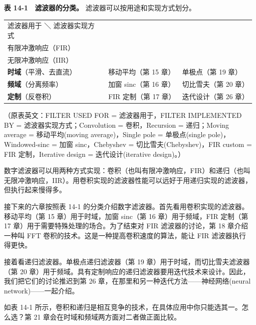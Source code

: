 \textbf{表 14-1　滤波器的分类。} 滤波器可以按用途和实现方式划分。

{\def\LTcaptype{none} %
\begin{longtable}[]{@{}
  >{\raggedright\arraybackslash}p{}
  >{\raggedright\arraybackslash}p{}
  >{\raggedright\arraybackslash}p{}@{}}
\toprule\noalign{}
\begin{minipage}[b]{\linewidth}\raggedright
滤波器用于 ＼ 滤波器实现方式
\end{minipage} & \begin{minipage}[b]{\linewidth}\raggedright
卷积\\
有限冲激响应（FIR）\strut
\end{minipage} & \begin{minipage}[b]{\linewidth}\raggedright
递归\\
无限冲激响应（IIR）\strut
\end{minipage} \\
\midrule\noalign{}
\endhead
\bottomrule\noalign{}
\endlastfoot
\textbf{时域}（平滑、去直流） & 移动平均（第 15 章） & 单极点（第 19
章） \\
\textbf{频域}（分离频率） & 加窗 sinc（第 16 章） & 切比雪夫（第 20
章） \\
\textbf{定制}（反卷积） & FIR 定制（第 17 章） & 迭代设计（第 26 章） \\
\end{longtable}
}

（原表英文：FILTER USED FOR = 滤波器用于，FILTER IMPLEMENTED BY =
滤波器实现方式；Convolution = 卷积，Recursion = 递归；Moving average =
移动平均(moving average)，Single pole = 单极点(single
pole)，Windowed-sinc = 加窗 sinc，Chebyshev = 切比雪夫(Chebyshev)，FIR
custom = FIR 定制，Iterative design = 迭代设计(iterative design)。）

数字滤波器可以用两种方式实现：卷积（也叫有限冲激响应，FIR）和递归（也叫无限冲激响应，IIR）。用卷积实现的滤波器性能可以远好于用递归实现的滤波器，但执行起来慢得多。

接下来的六章按照表 14-1
的分类介绍数字滤波器。首先看用卷积实现的滤波器。移动平均（第 15
章）用于时域，加窗 sinc（第 16 章）用于频域，FIR 定制（第 17
章）用于需要特殊处理的场合。为了结束对 FIR 滤波器的讨论，第 18
章介绍一种叫 FFT 卷积的技术。这是一种提高卷积速度的算法，能让 FIR
滤波器执行得更快。

接着看递归滤波器。单极点递归滤波器（第 19
章）用于时域，而切比雪夫滤波器（第 20
章）用于频域。具有定制响应的递归滤波器要用迭代技术来设计。因此，我们把它们的讨论推迟到第
26 章，在那里和另一种迭代方法------神经网络(neural
network)------一起介绍。

如表 14-1
所示，卷积和递归是相互竞争的技术，在具体应用中你只能选其一。怎么选？第
21 章会在时域和频域两方面对二者做正面比较。
